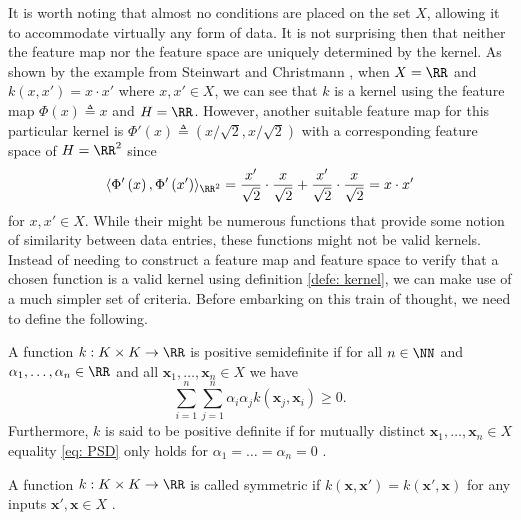 It is worth noting that almost no conditions are placed on the set $X$, allowing it to accommodate virtually any form of data. It is not surprising then that neither the feature map nor the feature space are uniquely determined by the kernel. As shown by the example from Steinwart and Christmann \cite{SteinwartIngo2008SVMb}, when $X = \RR$ and $k \left( x , x' \right) = x \cdot x'$ where $x , x' \in X$, we can see that $k$ is a kernel using the feature map $\Phi \left( x \right) \triangleq x$ and $H = \RR$. However, another suitable feature map for this particular kernel is $\Phi' \left( x \right) \triangleq \left( x / \sqrt{2} , x / \sqrt{2} \right)$ with a corresponding feature space of $H = \RR^2$ since
\[
    \langle \Phi' \left( x \right), \Phi' \left( x' \right) \rangle_{\RR^2} = \frac{x'}{\sqrt{2}} \cdot \frac{x}{\sqrt{2}} + \frac{x'}{\sqrt{2}} \cdot \frac{x}{\sqrt{2}} = x \cdot x'
\]
for $x,x' \in X$. While their might be numerous functions that provide some notion of similarity between data entries, these functions might not be valid kernels. Instead of needing to construct a feature map and feature space to verify that a chosen function is a valid kernel using definition \ref{defe: kernel}, we can make use of a much simpler set of criteria. Before embarking on this train of thought, we need to define the following.

\begin{defe} \label{defe: PD}
    A function $k : K \times K \to \RR$ is positive semidefinite if for all $n \in \NN$ and $\alpha_1 , \ldots , \alpha_n \in \RR$ and all $\bm{x}_1 ,\ldots , \bm{x}_n \in X$ we have
    \begin{equation}\label{eq: PSD}
        \sum_{i=1}^{n} \sum_{j=1}^{n} \alpha_i \alpha_j k \left( \bm{x}_j , \bm{x}_i \right) \geq 0.
    \end{equation}
    Furthermore, $k$ is said to be positive definite if for mutually distinct $\bm{x}_1 ,\ldots , \bm{x}_n \in X$ equality \ref{eq: PSD} only holds for $\alpha_1 = \ldots = \alpha_n = 0$ \cite{SteinwartIngo2008SVMb}.
\end{defe}

\begin{defe}[Symmetric] \label{defe: Symmetric_function}
    A function $k : K \times K \to \RR$ is called symmetric if $k \left( \bm{x} , \bm{x}' \right) = k \left( \bm{x}' , \bm{x} \right)$ for any inputs $\bm{x}' , \bm{x} \in X$ \cite{SteinwartIngo2008SVMb}.
\end{defe}


